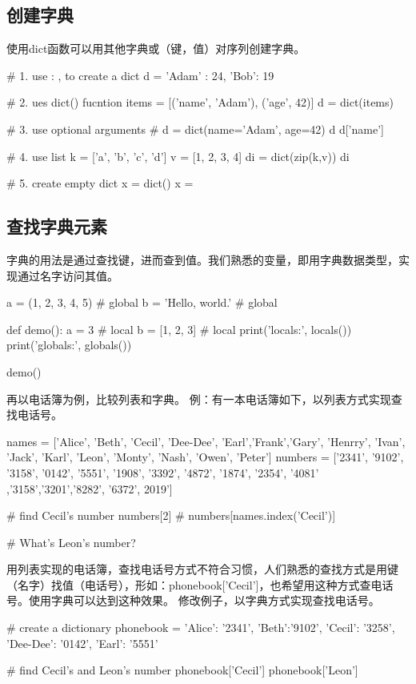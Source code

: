 \subsection{创建字典}
使用dict函数可以用其他字典或（键，值）对序列创建字典。
\begin{python}
  # 1. use {} : , to create a dict
  d = {'Adam' : 24, 'Bob': 19}

  # 2. ues dict() fucntion
  items = [('name', 'Adam'), ('age', 42)]
  d = dict(items)

  # 3. use optional arguments
  # d = dict(name='Adam', age=42) 
  d
  d['name']

  # 4. use list
  k = ['a', 'b', 'c', 'd']
  v = [1, 2, 3, 4]
  di = dict(zip(k,v))
  di

  # 5. create empty dict
  x = dict()
  x = {}
\end{python}
\subsection{查找字典元素}
字典的用法是通过查找键，进而查到值。我们熟悉的变量，即用字典数据类型，实现通过名字访问其值。
\begin{python}
a = (1, 2, 3, 4, 5)  #  global
b = 'Hello, world.'  #  global

def demo():
    a = 3            #  local
    b = [1, 2, 3]    #  local
    print('locals:', locals())
    print('globals:', globals())

demo()
\end{python}
再以电话簿为例，比较列表和字典。 例：有一本电话簿如下，以列表方式实现查找电话号。
\begin{python}
  names = ['Alice', 'Beth', 'Cecil', 'Dee-Dee', 'Earl','Frank','Gary',
  'Henrry', 'Ivan', 'Jack', 'Karl', 'Leon', 'Monty', 'Nash', 'Owen', 'Peter']
  numbers = ['2341', '9102', '3158', '0142', '5551', '1908', '3392',
  '4872', '1874', '2354', '4081' ,'3158','3201','8282', '6372', 2019']

# find Cecil's number
numbers[2]  # numbers[names.index('Cecil')]

# What's Leon's number?
\end{python}
用列表实现的电话簿，查找电话号方式不符合习惯，人们熟悉的查找方式是用键（名字）找值（电话号），形如：phonebook['Cecil']，也希望用这种方式查电话号。使用字典可以达到这种效果。
修改例子，以字典方式实现查找电话号。
\begin{python}
  # create a dictionary
  phonebook = {'Alice': '2341', 'Beth':'9102',
    'Cecil': '3258', 'Dee-Dee': '0142', 'Earl': '5551'}

  # find Cecil's and Leon's number
  phonebook['Cecil']
  phonebook['Leon']
\end{python}
